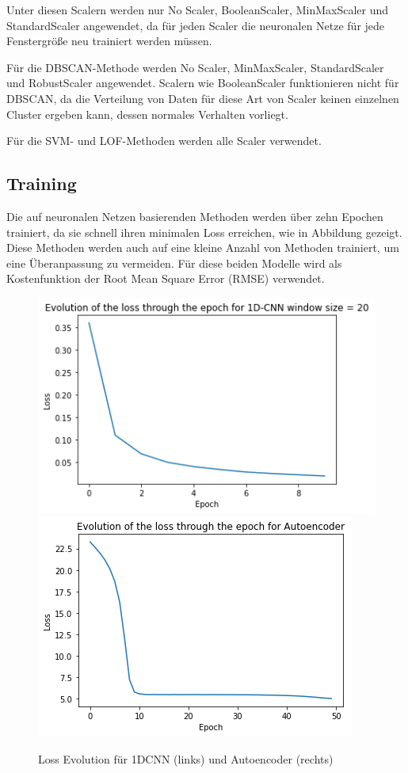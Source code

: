 \documentclass[12pt,a4paper]{scrartcl}
\numberwithin{equation}{section}
\begin{document}
\clearpage

Unter diesen Scalern werden nur No Scaler, BooleanScaler, MinMaxScaler und StandardScaler angewendet, da für jeden Scaler die neuronalen Netze für jede Fenstergröße neu trainiert werden müssen.

Für die DBSCAN-Methode werden No Scaler, MinMaxScaler, StandardScaler und RobustScaler angewendet. Scalern wie BooleanScaler funktionieren nicht für DBSCAN, da die Verteilung von Daten für diese Art von Scaler keinen einzelnen Cluster ergeben kann, dessen normales Verhalten vorliegt.

Für die SVM- und LOF-Methoden werden alle Scaler verwendet. 

\subsection{Training}

Die auf neuronalen Netzen basierenden Methoden werden über zehn Epochen trainiert, da sie schnell ihren minimalen Loss erreichen, wie in Abbildung \label{loss} gezeigt. Diese Methoden werden auch auf eine kleine Anzahl von Methoden trainiert, um eine Überanpassung zu vermeiden. Für diese beiden Modelle wird als Kostenfunktion der Root Mean Square Error (RMSE) verwendet. 

 \begin{figure}[ht!]
	\centering
	  \includegraphics[scale=0.5]{evol_1DCNN.png}
	  \includegraphics[scale=0.5]{loss_Autoencoder.png}
	  \caption{Loss Evolution für 1DCNN (links) und Autoencoder (rechts)}
	\label{loss}
\end{figure}
\end{document}
